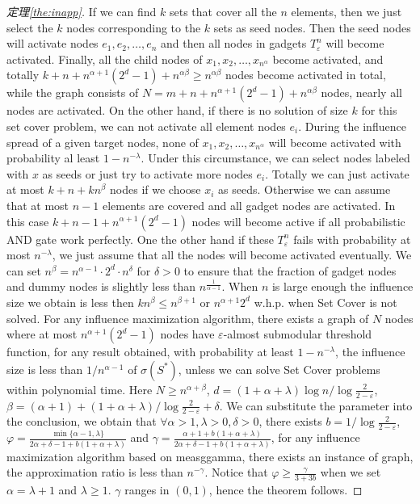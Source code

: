 \begin{proof}[定理\ref{the:inapp}]
If we can find $k$ sets that cover all the $n$ elements, then we just select the $k$ nodes corresponding to the $k$ sets as seed nodes.
Then the seed nodes will activate nodes $e_1, e_2, \dots, e_n$ and then all nodes in gadgets $T_\varepsilon^n$ will become activated.
Finally, all the child nodes of $x_1, x_2, \dots, x_{n^\alpha}$ become activated, and totally $k+n+n^{\alpha+1}(2^d-1)+n^{\alpha\beta} \geq n^{\alpha\beta}$ nodes become activated in total, while the graph consists of $N = m+n+n^{\alpha+1}(2^d-1)+n^{\alpha\beta}$ nodes, nearly all nodes are activated.
On the other hand, if there is no solution of size $k$ for this set cover problem, we can not activate all element nodes $e_i$.
During the influence spread of a given target nodes,
none of $x_1, x_2, \dots, x_{n^\alpha}$ will become activated with probability al least $1-n^{-\lambda}$.
Under this circumstance, we can select nodes labeled with $x$ as seeds or just try to activate more nodes $e_i$.
Totally we can just activate at most $k+n+kn^{\beta}$ nodes if we choose $x_i$ as seeds.
Otherwise we can assume that at most $n-1$ elements are covered and all gadget nodes are activated.
In this case $k+n-1+n^{\alpha+1}(2^d-1)$ nodes will become active if all probabilistic AND gate work perfectly.
One the other hand if these $T_\varepsilon^n$ fails with probability at most $n^{-\lambda}$, we just assume that all the nodes will become activated eventually.
We can set $n^{\beta} = n^{\alpha-1} \cdot 2^d \cdot n^{\delta}$ for $\delta>0$ to 
ensure that the fraction of gadget nodes and dummy nodes is slightly less than $n^{\frac{1}{\alpha-1}}$. 
When $n$ is large enough the influence size we obtain  
is less then $kn^{\beta} \leq n^{\beta+1}$ or $n^{\alpha+1}2^d$ w.h.p. when Set Cover is not solved.
For any influence maximization algorithm,
there exists a graph of $N$ nodes where at most $n^{\alpha+1}(2^d-1)$ nodes have $\varepsilon$-almost submodular threshold function,
for any result obtained,
with probability at least $1-n^{-\lambda}$,
the influence size is less than $1/n^{\alpha-1}$ of $\sigma(S^*)$,
unless we can solve Set Cover problems within polynomial time.
Here $N \geq n^{\alpha+\beta}$, $d = (1+\alpha+\lambda)\log n / \log{\frac{2}{2-\varepsilon}}$, $\beta = (\alpha+1) + (1+\alpha+\lambda) / \log{\frac{2}{2-\varepsilon}} + \delta$.
We can substitute the parameter into the conclusion, we obtain that $\forall \alpha>1, \lambda>0, \delta>0$, there exists
$b = 1/\log{\frac{2}{2-\varepsilon}}$,
$\varphi= \frac{ \min\{\alpha-1, \lambda\}}{2\alpha+\delta-1+b(1+\alpha+\lambda)}$ and
$\gamma =\frac{\alpha+1+b(1+\alpha+\lambda)}{2\alpha+\delta-1+b(1+\alpha+\lambda)}$,
for any influence maximization algorithm based on measg{gamma},
there exists an instance of graph,
the approximation ratio is less than $n^{-\gamma}$.
Notice that $\varphi \geq \frac{\gamma}{3+3b}$ when we set $\alpha=\lambda+1$ and $\lambda \geq 1$.
$\gamma$ ranges in $(0,1)$, hence the theorem follows.
\end{proof}

